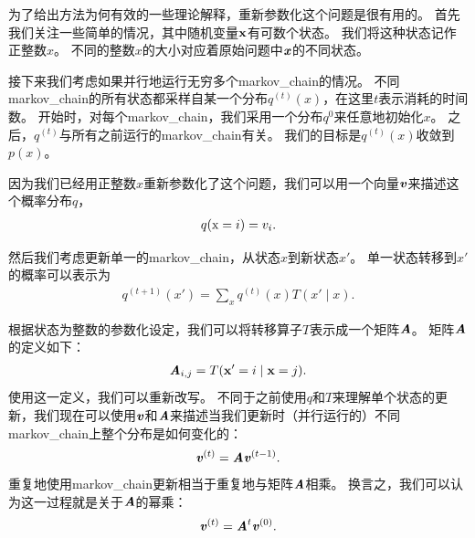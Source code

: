 为了给出方法为何有效的一些理论解释，重新参数化这个问题是很有用的。 
首先我们关注一些简单的情况，其中随机变量$\mathbf{x}$有可数个状态。
我们将这种状态记作正整数$x$。
不同的整数$x$的大小对应着原始问题中$\boldsymbol{\mathit{x}}$的不同状态。


接下来我们考虑如果并行地运行无穷多个\gls{markov_chain}的情况。  
不同\gls{markov_chain}的所有状态都采样自某一个分布$q^{(t)}(x)$，在这里$t$表示消耗的时间数。
开始时，对每个\gls{markov_chain}，我们采用一个分布$q^{{0}}$来任意地初始化$x$。  
之后，$q^{(t)}$与所有之前运行的\gls{markov_chain}有关。
我们的目标是$q^{(t)}(x)$收敛到$p(x)$。 


因为我们已经用正整数$x$重新参数化了这个问题，我们可以用一个向量$\boldsymbol{\mathit{v}}$来描述这个概率分布$q$，  
\begin{align}
q(\mathrm{x} = i) = v_i.
\end{align}


然后我们考虑更新单一的\gls{markov_chain}，从状态$x$到新状态$x'$。
单一状态转移到$x'$的概率可以表示为
\begin{align}
\label{eqn:transition1}
q^{(t+1)}(x') = \sum_{x} q^{(t)}(x) T(x'\mid x).
\end{align}


根据状态为整数的参数化设定，我们可以将转移算子$T$表示成一个矩阵$\boldsymbol{\mathit{A}}$。
矩阵$\boldsymbol{\mathit{A}}$的定义如下：
\begin{align}
\boldsymbol{\mathit{A}}_{i,j} = T(\mathbf{x}' = i\mid \mathbf{x} = j).
\end{align}
使用这一定义，我们可以重新改写。
不同于之前使用$q$和$T$来理解单个状态的更新，我们现在可以使用$\boldsymbol{\mathit{v}}$和$\boldsymbol{\mathit{A}}$来描述当我们更新时（并行运行的）不同\gls{markov_chain}上整个分布是如何变化的： 
\begin{align}
\boldsymbol{\mathit{v}}^{(t)} = \boldsymbol{\mathit{A}} \boldsymbol{\mathit{v}}^{(t-1)}.
\end{align}
重复地使用\gls{markov_chain}更新相当于重复地与矩阵$\boldsymbol{\mathit{A}}$相乘。  
换言之，我们可以认为这一过程就是关于$\boldsymbol{\mathit{A}}$的幂乘：  
\begin{align}
\boldsymbol{\mathit{v}}^{(t)} = \boldsymbol{\mathit{A}}^{t} \boldsymbol{\mathit{v}}^{(0)}.
\end{align}


